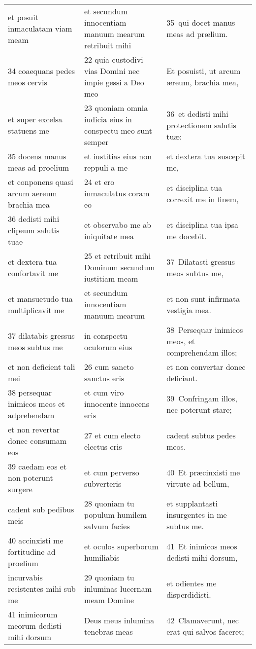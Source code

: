 \documentclass{article}
\begin{document}
\begin{longtable}{@{}p{}p{}p{}@{}}
et posuit inmaculatam viam meam	&	et secundum innocentiam manuum mearum retribuit mihi	&	35 qui docet manus meas ad prælium.	\\
34 coaequans pedes meos cervis	&	22 quia custodivi vias Domini nec impie gessi a Deo meo	&	Et posuisti, ut arcum æreum, brachia mea,	\\
et super excelsa statuens me	&	23 quoniam omnia iudicia eius in conspectu meo sunt semper	&	36 et dedisti mihi protectionem salutis tuæ:	\\
35 docens manus meas ad proelium	&	et iustitias eius non reppuli a me	&	et dextera tua suscepit me,	\\
et conponens quasi arcum aereum brachia mea	&	24 et ero inmaculatus coram eo	&	et disciplina tua correxit me in finem,	\\
36 dedisti mihi clipeum salutis tuae	&	et observabo me ab iniquitate mea	&	et disciplina tua ipsa me docebit.	\\
et dextera tua confortavit me	&	25 et retribuit mihi Dominum secundum iustitiam meam	&	37 Dilatasti gressus meos subtus me,	\\
et mansuetudo tua multiplicavit me	&	et secundum innocentiam manuum mearum	&	et non sunt infirmata vestigia mea.	\\
37 dilatabis gressus meos subtus me	&	in conspectu oculorum eius	&	38 Persequar inimicos meos, et comprehendam illos;	\\
et non deficient tali mei	&	26 cum sancto sanctus eris	&	et non convertar donec deficiant.	\\
38 persequar inimicos meos et adprehendam	&	et cum viro innocente innocens eris	&	39 Confringam illos, nec poterunt stare;	\\
et non revertar donec consumam eos	&	27 et cum electo electus eris	&	cadent subtus pedes meos.	\\
39 caedam eos et non poterunt surgere	&	et cum perverso subverteris	&	40 Et præcinxisti me virtute ad bellum,	\\
cadent sub pedibus meis	&	28 quoniam tu populum humilem salvum facies	&	et supplantasti insurgentes in me subtus me.	\\
40 accinxisti me fortitudine ad proelium	&	et oculos superborum humiliabis	&	41 Et inimicos meos dedisti mihi dorsum,	\\
incurvabis resistentes mihi sub me	&	29 quoniam tu inluminas lucernam meam Domine	&	et odientes me disperdidisti.	\\
41 inimicorum meorum dedisti mihi dorsum	&	Deus meus inlumina tenebras meas	&	42 Clamaverunt, nec erat qui salvos faceret;	\\

\end{longtable}
\end{document}
